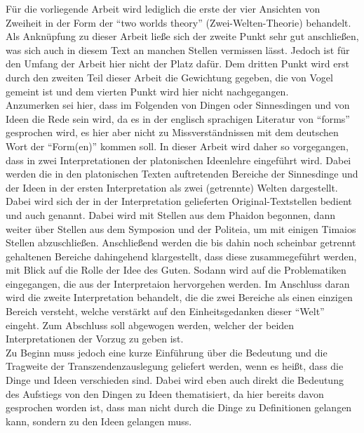 Für die vorliegende Arbeit wird lediglich die erste der vier Ansichten von Zweiheit in der Form der \enquote{two worlds theory} (Zwei-Welten-Theorie) behandelt. Als Anknüpfung zu dieser Arbeit ließe sich der zweite Punkt sehr gut anschließen, was sich auch in diesem Text an manchen Stellen vermissen lässt. Jedoch ist für den Umfang der Arbeit hier nicht der Platz dafür. Dem dritten Punkt wird erst durch den zweiten Teil dieser Arbeit die Gewichtung gegeben, die von Vogel gemeint ist und dem vierten Punkt wird hier nicht nachgegangen.\\
Anzumerken sei hier, dass im Folgenden von Dingen oder Sinnesdingen und von Ideen die Rede sein wird, da es in der englisch sprachigen Literatur von \enquote{forms} gesprochen wird, es hier aber nicht zu Missverständnissen mit dem deutschen Wort der \enquote{Form(en)} kommen soll. 
In dieser Arbeit wird daher so vorgegangen, dass in zwei Interpretationen der platonischen Ideenlehre eingeführt wird. Dabei werden die in den platonischen Texten auftretenden Bereiche der Sinnesdinge und der Ideen in der ersten Interpretation als zwei (getrennte) Welten dargestellt. Dabei wird sich der in der Interpretation gelieferten Original-Textstellen bedient und auch genannt. Dabei wird mit Stellen aus dem Phaidon begonnen, dann weiter über Stellen aus dem Symposion und der Politeia, um mit einigen Timaios Stellen abzuschließen. Anschließend werden die bis dahin noch scheinbar getrennt gehaltenen Bereiche dahingehend klargestellt, dass diese zusammegeführt werden, mit Blick auf die Rolle der Idee des Guten. Sodann wird auf die Problematiken eingegangen, die aus der Interpretaion hervorgehen werden. Im Anschluss daran wird die zweite Interpretation behandelt, die die zwei Bereiche als einen einzigen Bereich versteht, welche verstärkt auf den Einheitsgedanken dieser \enquote{Welt} eingeht. Zum Abschluss soll abgewogen werden, welcher der beiden Interpretationen der Vorzug zu geben ist.\\
Zu Beginn muss jedoch eine kurze Einführung über die Bedeutung und die Tragweite der Transzendenzauslegung geliefert werden, wenn es heißt, dass die Dinge und Ideen verschieden sind. Dabei wird eben auch direkt die Bedeutung des Aufstiegs von den Dingen zu Ideen thematisiert, da hier bereits davon gesprochen worden ist, dass man nicht durch die Dinge zu Definitionen gelangen kann, sondern zu den Ideen gelangen muss.
